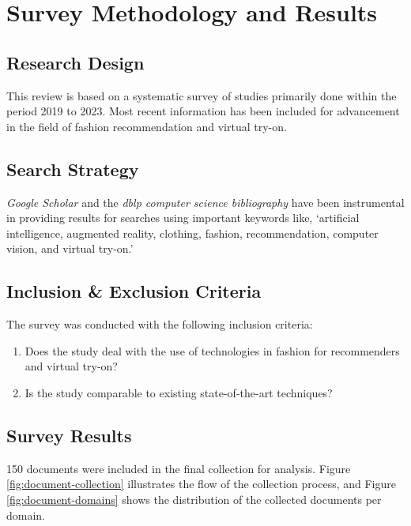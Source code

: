 \section{\textbf{Survey Methodology and Results}} \label{section:survey-methodology}
	\subsection{\textbf{Research Design}}
		This review is based on a systematic survey of studies primarily done within the period 2019 to 2023. Most recent information has been included for advancement in the field of fashion recommendation and virtual try-on.
	
	\subsection{\textbf{Search Strategy}}
		\textit{Google Scholar} and the \textit{dblp computer science bibliography} have been instrumental in providing results for searches using important keywords like, `artificial intelligence, augmented reality, clothing, fashion, recommendation, computer vision, and virtual try-on.'

	\subsection{\textbf{Inclusion \& Exclusion Criteria}}
		The survey was conducted with the following inclusion criteria:
		\begin{enumerate}
			\item Does the study deal with the use of technologies in fashion for recommenders and virtual try-on?
			\item Is the study comparable to existing state-of-the-art techniques?
		\end{enumerate}
	
	\subsection{\textbf{Survey Results}}
		150 documents were included in the final collection for analysis. Figure \ref{fig:document-collection} illustrates the flow of the collection process, and Figure \ref{fig:document-domains} shows the distribution of the collected documents per domain.


